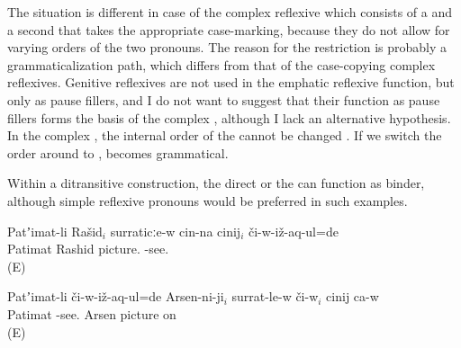 \begin{exe}
	\ex	{}		\label{ex:Rashid will you please stop staring at the mirror@C}
\end{exe}


The situation is different in case of the complex  reflexive which consists of a   and a second  that takes the appropriate case-marking, because they do not allow for varying orders of the two pronouns. The reason for the restriction is probably a grammaticalization path, which differs from that of the case-copying complex reflexives. Genitive reflexives are not used in the emphatic reflexive function, but only as pause fillers, and I do not want to suggest that their function as pause fillers forms the basis of the complex , although I lack an alternative hypothesis. In the complex  , the internal order of the   cannot be changed . If we switch the order around to ,  becomes grammatical.

\begin{exe}
\end{exe}

Within a ditransitive construction, the direct  or the   can function as binder, although simple reflexive pronouns would be preferred in such examples.

\begin{exe}
		\ex	\label{ex:Patimat showed Rashid to himself on the picture@12a}
		\gll	Patʼimat-li	Rašid$_{i}$	surraticːe-w	cin-na	cinij$_{i}$	či-w-iž-aq-ul=de\\
			Patimat	Rashid	picture.			-see.\\
		\glt	{} (E)

		\ex	\label{ex:Patimat showed to Arsen himself on the picture@12b}
		\gll	Patʼimat-li	či-w-iž-aq-ul=de	Arsen-ni-ji$_{i}$	surrat-le-w	či-w$_{i}$	cinij	ca-w\\
			Patimat	-see.	Arsen	picture	on		  \\
		\glt	{} (E)

\end{exe}

